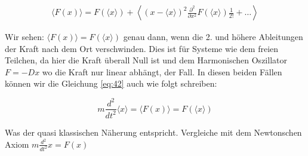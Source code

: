 \begin{align}
 \langle F(x) \rangle =   F(\langle x\rangle ) + \left\langle (x-\langle x\rangle)^2 \frac{\partial^2 }{\partial x^2} F(\langle x\rangle )\frac{1}{2!}+\dots \right\rangle 
\end{align}

Wir sehen: \(\langle F(x)\rangle = F(\langle x\rangle )\) genau dann, wenn die 2. und höhere Ableitungen der Kraft nach dem Ort verschwinden. Dies ist für Systeme wie dem freien Teilchen, da hier die Kraft überall Null ist und dem Harmonischen Oszillator \(F=-Dx\) wo die Kraft nur linear abhängt, der Fall. In diesen beiden Fällen können wir die Gleichung \eqref{eq:42} auch wie folgt schreiben:

\[ \boxed{m\frac{d^2}{dt^2} \langle x \rangle  = \langle F(x) \rangle = F(\langle x\rangle )  } \]

Was der quasi klassischen Näherung entspricht. Vergleiche mit dem Newtonschen Axiom \(m\frac{d^2}{dt^2} x  = F(x)  \)






